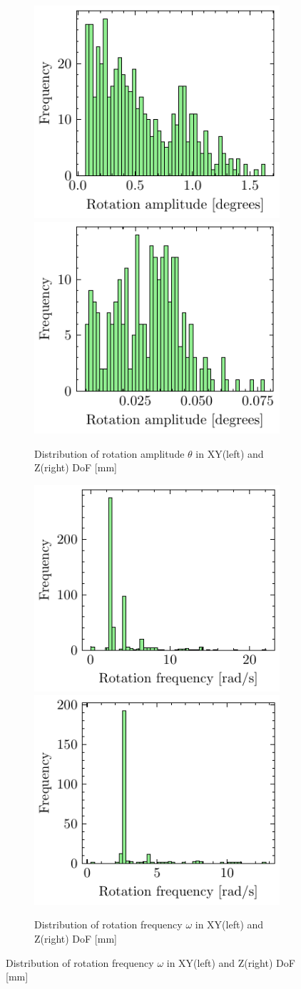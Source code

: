 \begin{figure}
    \begin{subfigure}{\linewidth}
    \includegraphics[width=.5\linewidth]{images/fig_chapter4/data_dist/7.pdf}\hfill
    \includegraphics[width=.5\linewidth]{images/fig_chapter4/data_dist/8.pdf}
    \caption{Distribution of rotation amplitude $ \theta $ in XY(left) and Z(right) DoF [mm]}
    \end{subfigure}\par\medskip
    
    \begin{subfigure}{\linewidth}
    \includegraphics[width=.5\linewidth]{images/fig_chapter4/data_dist/9.pdf}\hfill
    \includegraphics[width=.5\linewidth]{images/fig_chapter4/data_dist/10.pdf}
    \caption{Distribution of rotation frequency $ \omega $ in XY(left) and Z(right) DoF [mm]}
    \end{subfigure}\par\medskip
    

\end{figure}
